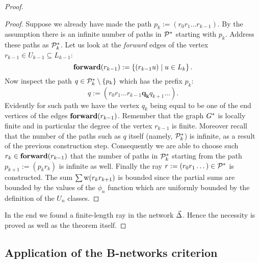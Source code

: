 \documentclass[12pt]{article}
\begin{document}
\begin{proof}
\begin{proof}
        Suppose we already have made the path $p_k:= (r_0 r_1\dots r_{k-1})$.
        By the assumption there is an infinite number of paths in $\cal{P}^*$ starting with $p_k$.
        Address these paths as $\cal{P}^*_k$.
        Let us look at the \emph{forward} edges of the vertex $r_{k-1} \in U_{k-1} \subseteq L_{k-1}$:
        \[
          \efor(r_{k-1}):=\left\{(r_{k-1} u) \mid u \in L_k\right\}.
        \]
        Now inspect the path $q \in \cal{P}^*_k \setminus \left\{p_k\right\}$ which has the prefix $p_k$:
        \[
          q:=(r_0 r_1 \dots r_{k-1} \mathbf{q_k} q_{k+1} \dots).
        \]
        Evidently for such path we have the vertex $q_k$ being equal to be one of the end vertices of the edges $\efor(r_{k-1})$.
        Remember that the graph $\gstar$ is locally finite and in particular the degree of the vertex $r_{k-1}$ is finite.
        Moreover recall that the number of the paths such as $q$ itself (namely, $\cal{P}^*_k$) is infinite,
          as a result of the previous construction step.
        Consequently we are able to choose such $r_k \in \efor(r_{k-1})$ that the number of paths in $\cal{P}^*_k$ starting from
          the path $p_{k+1}:= (p_k r_k)$ is infinite as well.
        Finally the ray $r := (r_0 r_1 \dots) \in \cal{P}^*$ is constructed.
        The sum $\sum \wtp(r_k r_{k+1})$ is bounded since the partial sums are bounded by the values of the $\phi_n$ function which are uniformly bounded
          by the definition of the $U_n$ classes.
      \end{proof}
      In the end we found a finite-length ray in the network $\onet$.
      Hence the necessity is proved as well as the theorem itself.
    \end{proof}
  \subsection{Application of the B-networks criterion}
\end{document}
